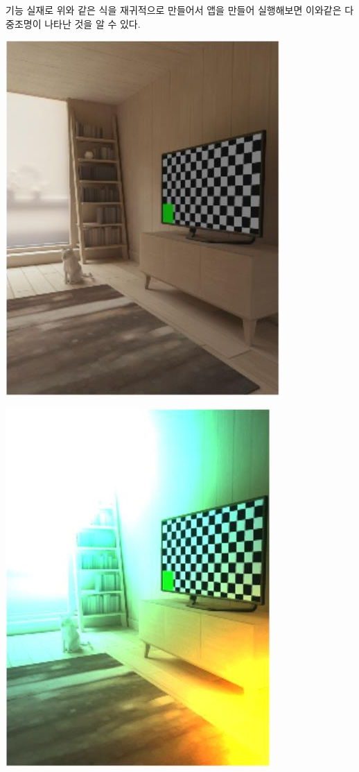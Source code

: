 \documentclass[a0paper,portrait]{baposter}
\begin{document}
\begin{poster}
\begin{posterbox}[name=equation,column=1,below=intro]{기능}
실재로 위와 같은 식을 재귀적으로 만들어서 앱을 만들어 실행해보면 이와같은 다중조명이 나타난 것을 알 수 있다.
\begin{center}
	\includegraphics[height=0.9\headerheight]{./logo/before.jpg}
	\label{fig:before}
\end{center}

\begin{center}
	\includegraphics[height=0.9\headerheight]{./logo/after.jpg}
	\label{fig:after}
\end{center}


\end{posterbox}
\end{poster}
\end{document}
